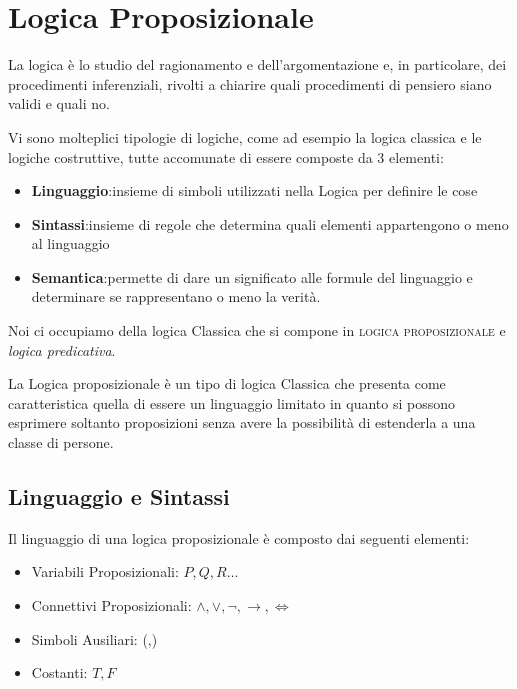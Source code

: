 \chapter{Logica Proposizionale}

La logica è lo studio del ragionamento e dell’argomentazione e, in particolare,
dei	procedimenti inferenziali, rivolti a chiarire quali	procedimenti di pensiero siano validi e quali no.

Vi sono molteplici tipologie di logiche, come ad esempio la logica classica e le logiche costruttive,
tutte accomunate di essere composte da 3 elementi:

\begin{itemize}
  \item \textbf{Linguaggio}:insieme di simboli utilizzati nella Logica per definire le cose
  \item \textbf{Sintassi}:insieme di regole che determina quali elementi appartengono o meno al linguaggio
  \item \textbf{Semantica}:permette di dare un significato alle formule del linguaggio e determinare
        se rappresentano o meno la verità.
\end{itemize}

Noi ci occupiamo della logica Classica che si compone in \textsc{logica proposizionale} e
\textit{logica predicativa}.

La Logica proposizionale è un tipo di logica Classica che presenta come caratteristica quella
di essere un linguaggio limitato in quanto si possono esprimere soltanto proposizioni senza
avere la possibilità di estenderla a una classe di persone.

\section{Linguaggio e Sintassi}
Il linguaggio di una logica proposizionale è composto dai seguenti elementi:

\begin{itemize}
  \item Variabili Proposizionali: $P,Q,R \dots$
  \item Connettivi Proposizionali: $\land, \lor, \neg, \rightarrow, \iff$
  \item Simboli Ausiliari: (,)
  \item Costanti: $T,F$
\end{itemize}

